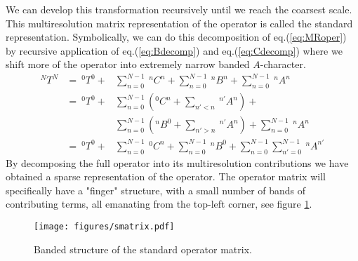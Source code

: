 We can develop this transformation recursively until we reach the coarsest 
scale. This multiresolution matrix representation of the operator is called the
standard representation. Symbolically, we can do this decomposition of
eq.(\ref{eq:MRoper}) by recursive application of eq.(\ref{eq:Bdecomp}) and
eq.(\ref{eq:Cdecomp}) where we shift more of the operator into extremely
narrow banded $A$-character.
\begin{eqnarray}
	\nonumber
	^{N}T^{N} 	&=\ ^0T^0 + 
				&\sum_{n=0}^{N-1}\ ^nC^n + 
				\sum_{n=0}^{N-1}\ ^nB^n + 
				\sum_{n=0}^{N-1}\ ^nA^n\\
	\nonumber
				&=\ ^0T^0 +
				&\sum_{n=0}^{N-1}\left(^0C^n + \sum_{n'<n}\ ^{n'}A^n\right) +\\
	\nonumber
				&&
				\sum_{n=0}^{N-1}\left(^nB^0 + \sum_{n'>n}\ ^{n'}A^n\right) + 
				\sum_{n=0}^{N-1}\ ^nA^n\\
				&=\ ^0T^0 + 
				&\sum_{n=0}^{N-1}\ ^0C^n + \sum_{n=0}^{N-1}\ ^nB^0 +
				\sum_{n=0}^{N-1}\sum_{n'=0}^{N-1}\ ^nA^{n'}
				\label{eq:MRoperS}
\end{eqnarray}
By decomposing the full operator into its multiresolution
contributions we have obtained a sparse representation of the operator. The
operator matrix will specifically have a "finger" structure, with a small
number of bands of contributing terms, all emanating from the top-left corner,
see figure \ref{fig:smatrix}.

\begin{figure}
	\centering
	\texttt{[image: figures/smatrix.pdf]}
	\caption{Banded structure of the standard operator matrix.}
	\label{fig:smatrix}
\end{figure}


